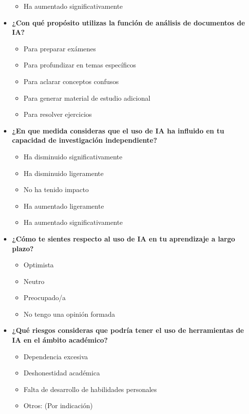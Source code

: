 \documentclass{article}
\newenvironment{recoleccionDeInformacion}{}{}
\begin{document}
\begin{recoleccionDeInformacion}
\begin{multicols}{2}
\begin{itemize}
\begin{itemize}
        \item Ha aumentado significativamente
      \end{itemize}
      \item \textbf{¿Con  qué  propósito  utilizas  la  función  de  análisis  de  documentos  de  IA?}
      \begin{itemize}
        \item Para preparar exámenes
        \item Para profundizar en temas específicos
        \item Para aclarar conceptos confusos
        \item Para generar material de estudio adicional
        \item Para resolver ejercicios
      \end{itemize}
      \item \textbf{¿En que medida consideras que el uso de IA  ha influido en tu capacidad de investigación independiente?}
      \begin{itemize}
        \item Ha disminuido significativamente
        \item Ha disminuido ligeramente
        \item No ha tenido impacto
        \item Ha aumentado ligeramente
        \item Ha aumentado significativamente
      \end{itemize}
      \item \textbf{¿Cómo te sientes respecto al uso de IA en tu aprendizaje a largo plazo?}
      \begin{itemize}
        \item Optimista
        \item Neutro
        \item Preocupado/a
        \item No tengo una opinión formada
      \end{itemize}
      \item \textbf{¿Qué riesgos consideras que podría tener el uso de herramientas de IA en el ámbito académico?}
      \begin{itemize}
        \item Dependencia excesiva
        \item Deshonestidad académica
        \item Falta de desarrollo de habilidades personales
        \item Otros: (Por indicación) 

\end{itemize}
\end{itemize}
\end{multicols}
\end{recoleccionDeInformacion}
\end{document}
